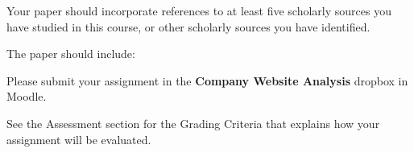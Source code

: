\documentclass[
]{book}
\providecommand{\tightlist}{%
  \setlength{\itemsep}{0pt}\setlength{\parskip}{0pt}}
\begin{document}
\begin{assessment}
Your paper should incorporate references to at least five scholarly
sources you have studied in this course, or other scholarly sources you
have identified.

The paper should include:


Please submit your assignment in the \textbf{Company Website Analysis}
dropbox in Moodle.

See the Assessment section for the Grading Criteria that explains how
your assignment will be evaluated.
\end{assessment}
\end{document}
